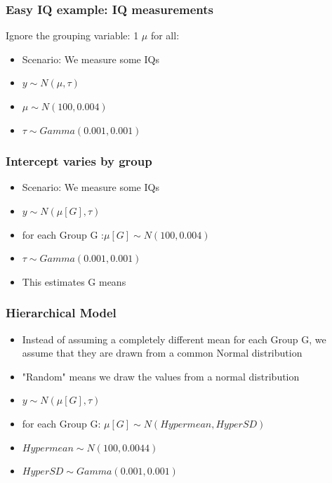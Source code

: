 \documentclass[hyperref={pdfpagelabels=false},unknownkeysallowed]{beamer}
\begin{document}

\begin{frame}
\frametitle{Easy IQ example: IQ measurements}
Ignore the grouping variable: 1 $\mu$ for all:
\begin{itemize}
    \item Scenario: We measure some IQs
	\item $y \sim N(\mu,\tau)$
    \item $\mu \sim N(100,0.004)$ 
    \item $\tau \sim Gamma(0.001,0.001)$
    \end{itemize} 
\note{}
\end{frame}


\begin{frame}
\frametitle{Intercept varies by group}
\begin{itemize}
    \item Scenario: We measure some IQs
	\item $y \sim N(\mu[G],\tau)$
    \item for each Group G :$\mu[G] \sim N(100,0.004)$ 
    \item $\tau \sim Gamma(0.001,0.001)$
    \item This estimates G means
    \end{itemize} 
\note{}
\end{frame}

\begin{frame}
\frametitle{Hierarchical Model}
\begin{itemize}
    \item Instead of assuming a completely different mean for each Group G, we assume that they are drawn from a common Normal distribution
    \item "Random" means we draw the values from a normal distribution 
\item $y \sim N(\mu[G],\tau)$ 
\item for each Group G:  $\mu[G] \sim N(Hypermean,HyperSD)$
\item $Hypermean \sim N(100,0.0044)$
\item $HyperSD \sim Gamma(0.001,0.001)$
    \end{itemize} 
\note{}
\end{frame}
\end{document}

